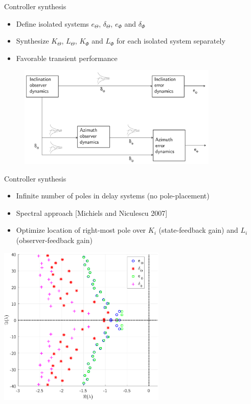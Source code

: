 \documentclass{beamer}
\begin{document}
\begin{frame}{Controller synthesis}
\begin{itemize}\setlength\itemsep{0.9em}
	\item Define isolated systems $e_\Theta$, $\delta_\Theta$, $e_\Phi$ and $\delta_\Phi$
	\item Synthesize $K_\Theta$, $L_\Theta$, $K_\Phi$ and $L_\Phi$ for each isolated system separately
	\item Favorable transient performance
\end{itemize}
	\begin{figure}[ht]\centering
		\includegraphics[width=0.85\textwidth]{images/ISS.pdf}
	\end{figure}
\end{frame}

\begin{frame}{Controller synthesis}
\begin{itemize}
	\item Infinite number of poles in delay systems (no pole-placement)
	\item Spectral approach [Michiels and Niculescu 2007]
	\item Optimize location of right-most pole over $K_i$ (state-feedback gain) and $L_i$ (observer-feedback gain)
\end{itemize}

\hspace{2.0cm} \includegraphics[width=0.6\textwidth]{images/ClosedLoopPolesNeutral.pdf}
\end{frame}
\end{document}
